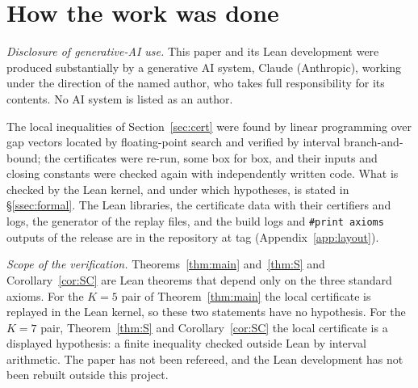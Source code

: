 \section{How the work was done}\label{app:how}

\emph{Disclosure of generative-AI use.} This paper and its Lean development were produced substantially by a generative AI system, Claude
(Anthropic), working under the direction of the named author, who takes full responsibility for its contents. No AI system is listed as an author.

The local inequalities of Section~\ref{sec:cert} were found by linear programming over gap vectors located by floating-point search and
verified by interval branch-and-bound; the certificates were re-run, some box for box, and their inputs and closing constants were checked
again with independently written code. What is checked by the Lean kernel, and under which hypotheses, is stated in \S\ref{ssec:formal}. The
Lean libraries, the certificate data with their certifiers and logs, the generator of the replay files, and the build logs and
\texttt{\#print axioms} outputs of the release are in the repository \repourl{} at tag \repotag{} (Appendix~\ref{app:layout}).

\emph{Scope of the verification.} Theorems~\ref{thm:main} and~\ref{thm:S} and Corollary~\ref{cor:SC} are Lean theorems that depend only on
the three standard axioms. For the $K=5$ pair of Theorem~\ref{thm:main} the local certificate is replayed in the Lean kernel, so these two
statements have no hypothesis. For the $K=7$ pair, Theorem~\ref{thm:S} and Corollary~\ref{cor:SC} the local certificate is a displayed
hypothesis: a finite inequality checked outside Lean by interval arithmetic. The paper has not been refereed, and the Lean development has
not been rebuilt outside this project.
